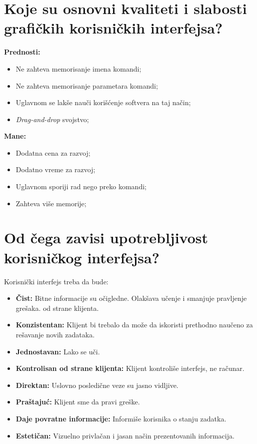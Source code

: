 \documentclass[a4paper]{article}
\begin{document}
\section{Koje su osnovni kvaliteti i slabosti grafičkih korisničkih interfejsa?}
  \noindent \textbf{Prednosti:}
  \begin{itemize}
    \item Ne zahteva memorisanje imena komandi;
    \item Ne zahteva memorisanje parametara komandi;
    \item Uglavnom se lakše nauči korišćenje softvera na taj način;
    \item \textit{Drag-and-drop} svojstvo;
  \end{itemize}
  \textbf{Mane:}
  \begin{itemize}
    \item Dodatna cena za razvoj;
    \item Dodatno vreme za razvoj; 
    \item Uglavnom sporiji rad nego preko komandi;
    \item Zahteva više memorije;
  \end{itemize}

\section{Od čega zavisi upotrebljivost korisničkog interfejsa?}
  Korisnički interfejs treba da bude:
  \begin{itemize}
    \item \textbf{Čist:} Bitne informacije su očigledne. Olakšava učenje i smanjuje pravljenje
          grešaka.
          od strane klijenta. 
    \item \textbf{Konzistentan:} Klijent bi trebalo da može da iskoristi prethodno naučeno
          za rešavanje novih zadataka.
    \item \textbf{Jednostavan:} Lako se uči.
    \item \textbf{Kontrolisan od strane klijenta:} Klijent kontroliše interfejs, ne računar.
    \item \textbf{Direktan:} Uslovno posledične veze su jasno vidljive.
    \item \textbf{Praštajuć:} Klijent sme da pravi greške.
    \item \textbf{Daje povratne informacije:} Informiše korisnika o stanju zadatka. 
    \item \textbf{Estetičan:} Vizuelno privlačan i jasan način prezentovanih informacija.\cite{uw_ui}
  \end{itemize}
\end{document}
